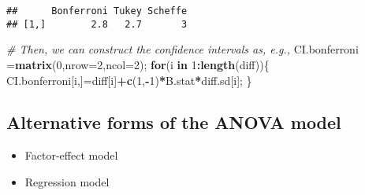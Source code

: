 \documentclass[12pt,]{book}
\newenvironment{Shaded}{\begin{snugshade}}{\end{snugshade}}
\newcommand{\KeywordTok}[1]{\textcolor[rgb]{0.13,0.29,0.53}{\textbf{#1}}}
\newcommand{\DataTypeTok}[1]{\textcolor[rgb]{0.13,0.29,0.53}{#1}}
\newcommand{\DecValTok}[1]{\textcolor[rgb]{0.00,0.00,0.81}{#1}}
\newcommand{\StringTok}[1]{\textcolor[rgb]{0.31,0.60,0.02}{#1}}
\newcommand{\CommentTok}[1]{\textcolor[rgb]{0.56,0.35,0.01}{\textit{#1}}}
\newcommand{\ControlFlowTok}[1]{\textcolor[rgb]{0.13,0.29,0.53}{\textbf{#1}}}
\newcommand{\OperatorTok}[1]{\textcolor[rgb]{0.81,0.36,0.00}{\textbf{#1}}}
\newcommand{\NormalTok}[1]{#1}
\providecommand{\tightlist}{%
  \setlength{\itemsep}{0pt}\setlength{\parskip}{0pt}}
\begin{document}
\begin{Shaded}
\end{Shaded}

\begin{verbatim}
##      Bonferroni Tukey Scheffe
## [1,]        2.8   2.7       3
\end{verbatim}

\begin{Shaded}
\begin{Highlighting}[]
\CommentTok{# Then, we can construct the confidence intervals as, e.g.,}
\NormalTok{CI.bonferroni =}\KeywordTok{matrix}\NormalTok{(}\DecValTok{0}\NormalTok{,}\DataTypeTok{nrow=}\DecValTok{2}\NormalTok{,}\DataTypeTok{ncol=}\DecValTok{2}\NormalTok{);}
\ControlFlowTok{for}\NormalTok{(i }\ControlFlowTok{in} \DecValTok{1}\OperatorTok{:}\KeywordTok{length}\NormalTok{(diff))\{}
\NormalTok{  CI.bonferroni[i,]=diff[i]}\OperatorTok{+}\KeywordTok{c}\NormalTok{(}\DecValTok{1}\NormalTok{,}\OperatorTok{-}\DecValTok{1}\NormalTok{)}\OperatorTok{*}\NormalTok{B.stat}\OperatorTok{*}\NormalTok{diff.sd[i];}
\NormalTok{\}}
\end{Highlighting}
\end{Shaded}

\subsection{Alternative forms of the ANOVA
model}\label{alternative-forms-of-the-anova-model}

\begin{itemize}
\tightlist
\item
  Factor-effect model
\item
  Regression model
\end{itemize}
\end{document}
